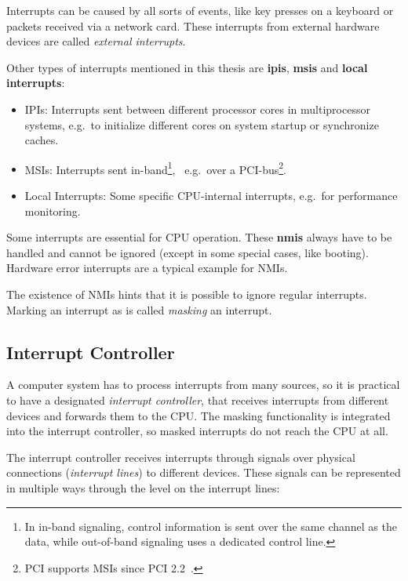 Interrupts can be caused by all sorts of events, like key presses on a keyboard or packets received via a network card.
These interrupts from external hardware devices are called \textit{external interrupts}.

Other types of interrupts mentioned in this thesis are \textbf{\glspl{ipi}}, \textbf{\glspl{msi}} and \textbf{\glspl{local interrupt}}:

\begin{itemize}
  \item IPIs: Interrupts sent between different processor cores in multiprocessor systems, e.g.\ to initialize different cores on system startup or synchronize caches.
  \item MSIs: Interrupts sent in-band\footnote{
          In in-band signaling, control information is sent over the same channel as the data, while out-of-band signaling uses a dedicated control line.},
        \ e.g.\ over a PCI-bus\footnote{
          PCI supports MSIs since PCI 2.2~\autocite[sec.~6.8]{pci22}.}.
  \item Local Interrupts: Some specific CPU-internal interrupts, e.g.\ for performance monitoring.
\end{itemize}

Some interrupts are essential for CPU operation.
These \textbf{\glspl{nmi}} always have to be handled and cannot be ignored (except in some special cases, like booting).
Hardware error interrupts are a typical example for NMIs.

The existence of NMIs hints that it is possible to ignore regular interrupts.
Marking an interrupt as  is called \textit{masking} an interrupt.

\subsection{Interrupt Controller}
\label{subsec:controller}

A computer system has to process interrupts from many sources, so it is practical to have a designated \textit{interrupt controller}, that receives interrupts from different devices and forwards them to the CPU\@.
The masking functionality is integrated into the interrupt controller, so masked interrupts do not reach the CPU at all.

The interrupt controller receives interrupts through signals over physical connections (\textit{interrupt lines}) to different devices.
These signals can be represented in multiple ways through the level on the interrupt lines:

